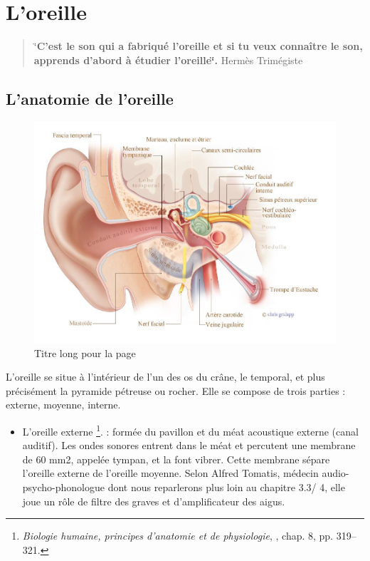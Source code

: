 \section{L'oreille}


\begin{quotation}
	\char`\"{}\textbf{C'est le son qui a fabriqué l'oreille et si tu veux connaître
		le son, apprends d'abord à étudier l\textquoteright oreille\char`\"{}.}
	Hermès Trimégiste
\end{quotation}

\subsection{L'anatomie de l'oreille}
\begin{figure}
	\centering
	\includegraphics[width=0.7\linewidth]{images/20160624Berufsfeldgruppen.jpg}
	\caption[Titre pour toc]{Titre long pour la page}
	\label{fig:-20160624berufsfeldgruppen}
\end{figure}

L'oreille\autocite[ch. 8 pp. 319--321]{marieb:biologie} 
se situe à l'intérieur de l'un des os du crâne, le temporal, et plus précisément la pyramide pétreuse ou rocher. Elle se compose de trois parties : externe, moyenne, interne.
\begin{itemize}
	\item  L'oreille externe \footnote{\textsl{Biologie humaine, principes d'anatomie et de physiologie}, \cite{marieb:biologie}, chap. 8, pp. 319--321.}.
	: formée du pavillon et du méat acoustique externe
	(canal auditif). Les ondes sonores entrent dans le méat et percutent
	une membrane de 60 mm2, appelée tympan, et la font vibrer. Cette membrane
	sépare l'oreille externe de l'oreille moyenne. 
	Selon Alfred Tomatis, médecin audio-psycho-phonologue dont nous reparlerons plus loin au chapitre 3.3/ 4, elle
	joue un rôle de filtre des graves et d'amplificateur des aigus.
\end{itemize}



